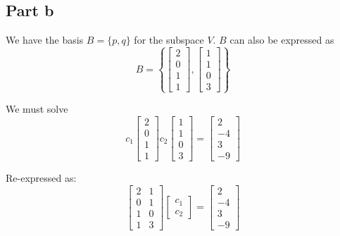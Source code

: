 \subsection{Part b}
We have the basis $B = \{p,q\}$ for the subspace $V$. $B$ can also be expressed as
\[
	B = \left\{\begin{bmatrix}2\\0\\1\\1\end{bmatrix}, \begin{bmatrix}1\\1\\0\\3\end{bmatrix} \right\}
\]

We must solve
\[
	c_1\begin{bmatrix}2\\0\\1\\1\end{bmatrix} c_2 \begin{bmatrix}1\\1\\0\\3\end{bmatrix} = \begin{bmatrix}2\\-4\\3\\-9\end{bmatrix}
\]

Re-expressed as:
\[
	\begin{bmatrix}2 & 1\\0 & 1\\1 & 0\\1 & 3\end{bmatrix}\begin{bmatrix}c_1\\c_2\end{bmatrix} = \begin{bmatrix}2\\-4\\3\\-9\end{bmatrix}
\]

